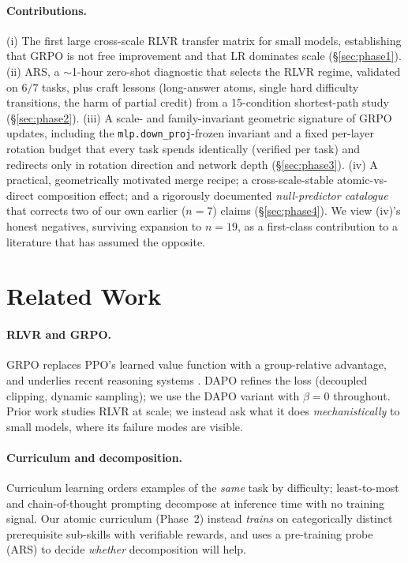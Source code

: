 \documentclass{article}
\begin{document}
\paragraph{Contributions.}
(i) The first large cross-scale RLVR transfer matrix for small models, establishing that GRPO
is not free improvement and that LR dominates scale (\S\ref{sec:phase1}).
(ii) ARS, a $\sim$1-hour zero-shot diagnostic that selects the RLVR regime, validated on $6/7$
tasks, plus craft lessons (long-answer atoms, single hard difficulty transitions, the harm of
partial credit) from a 15-condition shortest-path study (\S\ref{sec:phase2}).
(iii) A scale- and family-invariant geometric signature of GRPO updates, including the
\texttt{mlp.down\_proj}-frozen invariant and a fixed per-layer rotation budget that every task spends
identically (verified per task) and redirects only in rotation direction and network depth
(\S\ref{sec:phase3}).
(iv) A practical, geometrically motivated merge recipe; a cross-scale-stable atomic-vs-direct
composition effect; and a rigorously documented \emph{null-predictor catalogue} that corrects
two of our own earlier ($n{=}7$) claims (\S\ref{sec:phase4}).
We view (iv)'s honest negatives, surviving expansion to $n{=}19$, as a first-class
contribution to a literature that has assumed the opposite.

\section{Related Work}
\paragraph{RLVR and GRPO.} GRPO \citep{shao2024deepseekmath} replaces PPO's
\citep{schulman2017ppo} learned value function with a group-relative advantage, and underlies
recent reasoning systems \citep{deepseekai2025r1}. DAPO \citep{yu2025dapo} refines the loss
(decoupled clipping, dynamic sampling); we use the DAPO variant with $\beta{=}0$ throughout.
Prior work studies RLVR at scale; we instead ask what it does \emph{mechanistically} to small
models, where its failure modes are visible.

\paragraph{Curriculum and decomposition.} Curriculum learning \citep{bengio2009curriculum}
orders examples of the \emph{same} task by difficulty; least-to-most and chain-of-thought
prompting \citep{zhou2023leasttomost,wei2022cot} decompose at inference time with no training
signal. Our atomic curriculum (Phase~2) instead \emph{trains} on categorically distinct
prerequisite sub-skills with verifiable rewards, and uses a pre-training probe (ARS) to decide
\emph{whether} decomposition will help.
\end{document}
